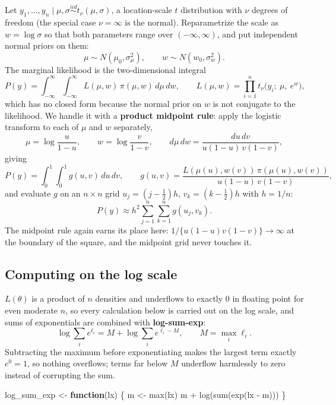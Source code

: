 \documentclass[
  letterpaper,
  DIV=11,
  numbers=noendperiod]{scrreprt}
\newenvironment{Shaded}{\begin{snugshade}}{\end{snugshade}}
\newcommand{\ControlFlowTok}[1]{\textcolor[rgb]{0.00,0.23,0.31}{\textbf{#1}}}
\newcommand{\FunctionTok}[1]{\textcolor[rgb]{0.28,0.35,0.67}{#1}}
\newcommand{\NormalTok}[1]{\textcolor[rgb]{0.00,0.23,0.31}{#1}}
\newcommand{\OtherTok}[1]{\textcolor[rgb]{0.00,0.23,0.31}{#1}}
\newcommand{\SpecialCharTok}[1]{\textcolor[rgb]{0.37,0.37,0.37}{#1}}
\begin{document}
Let
\(y_1,\ldots,y_n \mid \mu, \sigma \overset{iid}{\sim} t_\nu(\mu,\sigma)\),
a location-scale \(t\) distribution with \(\nu\) degrees of freedom (the
special case \(\nu=\infty\) is the normal). Reparametrize the scale as
\(w = \log \sigma\) so that both parameters range over
\((-\infty,\infty)\), and put independent normal priors on them: \[
\mu \sim N(\mu_0, \sigma_\mu^2), \qquad w \sim N(w_0, \sigma_w^2).
\] The marginal likelihood is the two-dimensional integral \[
P(y) = \int_{-\infty}^{\infty}\!\int_{-\infty}^{\infty}
 L(\mu, w)\,\pi(\mu, w)\, d\mu\, dw,
\qquad L(\mu,w) = \prod_{i=1}^n t_\nu\!\big(y_i;\ \mu,\ e^w\big),
\] which has no closed form because the normal prior on \(w\) is not
conjugate to the likelihood. We handle it with a \textbf{product
midpoint rule}: apply the logistic transform to each of \(\mu\) and
\(w\) separately, \[
\mu = \log\frac{u}{1-u}, \qquad w = \log\frac{v}{1-v}, \qquad
d\mu\,dw = \frac{du\,dv}{u(1-u)\,v(1-v)},
\] giving \[
P(y) = \int_0^1\!\int_0^1 g(u,v)\,du\,dv, \qquad
g(u,v) = \frac{L(\mu(u),w(v))\,\pi(\mu(u),w(v))}{u(1-u)\,v(1-v)},
\] and evaluate \(g\) on an \(n \times n\) grid \(u_j = (j-\tfrac12)h\),
\(v_k =
(k-\tfrac12)h\) with \(h=1/n\): \[
P(y) \approx h^2 \sum_{j=1}^n \sum_{k=1}^n g(u_j, v_k).
\] The midpoint rule again earns its place here:
\(1/\{u(1-u)v(1-v)\} \to \infty\) at the boundary of the square, and the
midpoint grid never touches it.

\subsection{Computing on the log
scale}\label{computing-on-the-log-scale}

\(L(\theta)\) is a product of \(n\) densities and underflows to exactly
\(0\) in floating point for even moderate \(n\), so every calculation
below is carried out on the log scale, and sums of exponentials are
combined with \textbf{log-sum-exp}: \[
\log \sum_i e^{\ell_i} = M + \log \sum_i e^{\ell_i - M}, \qquad M = \max_i \ell_i.
\] Subtracting the maximum before exponentiating makes the largest term
exactly \(e^0=1\), so nothing overflows; terms far below \(M\) underflow
harmlessly to zero instead of corrupting the sum.

\begin{Shaded}
\begin{Highlighting}[]
\NormalTok{log\_sum\_exp }\OtherTok{\textless{}{-}} \ControlFlowTok{function}\NormalTok{(lx) \{}
\NormalTok{    m }\OtherTok{\textless{}{-}} \FunctionTok{max}\NormalTok{(lx)}
\NormalTok{    m }\SpecialCharTok{+} \FunctionTok{log}\NormalTok{(}\FunctionTok{sum}\NormalTok{(}\FunctionTok{exp}\NormalTok{(lx }\SpecialCharTok{{-}}\NormalTok{ m)))}
\NormalTok{\}}
\end{Highlighting}
\end{Shaded}
\end{document}
